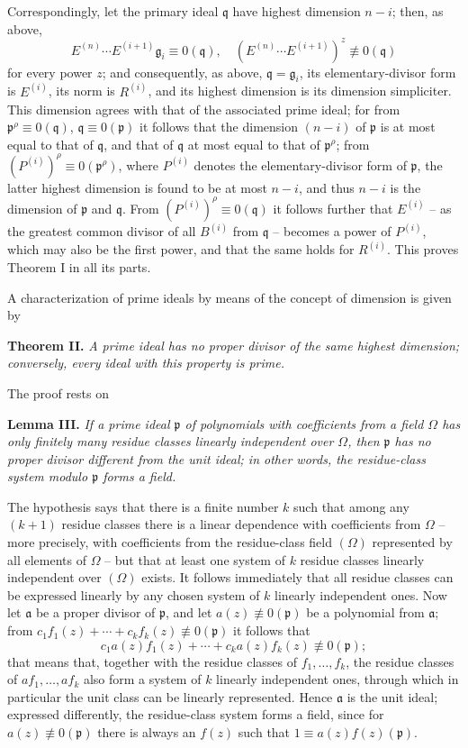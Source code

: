 \documentclass[11pt]{article}
\providecommand{\frakp}{\mathfrak p}
\providecommand{\frakq}{\mathfrak q}
\providecommand{\fraka}{\mathfrak a}
\providecommand{\frakg}{\mathfrak g}
\providecommand{\fraka}{\mathfrak a}
\providecommand{\frakp}{\mathfrak p}
\providecommand{\frakp}{\mathfrak p}
\providecommand{\frakq}{\mathfrak q}
\begin{document}
Correspondingly, let the primary ideal $\frakq$ have highest dimension $n-i$; then, as above,
\[
 E^{(n)}\cdots E^{(i+1)}\frakg_i\equiv0(\frakq),\quad
 (E^{(n)}\cdots E^{(i+1)})^z\not\equiv0(\frakq)
\]
for every power $z$; and consequently, as above, $\frakq=\frakg_i$, its elementary-divisor form is $E^{(i)}$, its norm is $R^{(i)}$, and its highest dimension is its dimension simpliciter. This dimension agrees with that of the associated prime ideal; for from $\frakp^\rho\equiv0(\frakq)$, $\frakq\equiv0(\frakp)$ it follows that the dimension $(n-i)$ of $\frakp$ is at most equal to that of $\frakq$, and that of $\frakq$ at most equal to that of $\frakp^\rho$; from $(P^{(i)})^\rho\equiv0(\frakp^\rho)$, where $P^{(i)}$ denotes the elementary-divisor form of $\frakp$, the latter highest dimension is found to be at most $n-i$, and thus $n-i$ is the dimension of $\frakp$ and $\frakq$. From $(P^{(i)})^\rho\equiv0(\frakq)$ it follows further that $E^{(i)}$ -- as the greatest common divisor of all $B^{(i)}$ from $\frakq$ -- becomes a power of $P^{(i)}$, which may also be the first power, and that the same holds for $R^{(i)}$. This proves Theorem I in all its parts.

A characterization of prime ideals by means of the concept of dimension is given by

\textbf{Theorem II.} \emph{A prime ideal has no proper divisor of the same highest dimension; conversely, every ideal with this property is prime.}

The proof rests on

\textbf{Lemma III.} \emph{If a prime ideal $\frakp$ of polynomials with coefficients from a field $\Omega$ has only finitely many residue classes linearly independent over $\Omega$, then $\frakp$ has no proper divisor different from the unit ideal; in other words, the residue-class system modulo $\frakp$ forms a field.}

The hypothesis says that there is a finite number $k$ such that among any $(k+1)$ residue classes there is a linear dependence with coefficients from $\Omega$ -- more precisely, with coefficients from the residue-class field $(\Omega)$ represented by all elements of $\Omega$ -- but that at least one system of $k$ residue classes linearly independent over $(\Omega)$ exists. It follows immediately that all residue classes can be expressed linearly by any chosen system of $k$ linearly independent ones. Now let $\fraka$ be a proper divisor of $\frakp$, and let $a(z)\not\equiv0(\frakp)$ be a polynomial from $\fraka$; from $c_1f_1(z)+\cdots+c_kf_k(z)\not\equiv0(\frakp)$ it follows that
\[
 c_1a(z)f_1(z)+\cdots+c_ka(z)f_k(z)\not\equiv0(\frakp);
\]
that means that, together with the residue classes of $f_1,\ldots,f_k$, the residue classes of $af_1,\ldots,af_k$ also form a system of $k$ linearly independent ones, through which in particular the unit class can be linearly represented. Hence $\fraka$ is the unit ideal; expressed differently, the residue-class system forms a field, since for $a(z)\not\equiv0(\frakp)$ there is always an $f(z)$ such that $1\equiv a(z)f(z)(\frakp)$.
\end{document}
